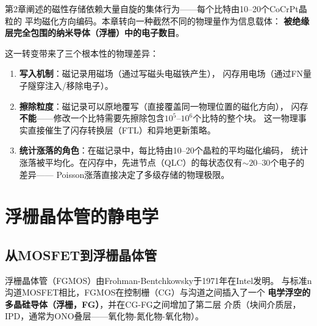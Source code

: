 \documentclass[11pt,a4paper,openany]{book}
\theoremstyle{definition}
\theoremstyle{plain}
\theoremstyle{remark}
\begin{document}
第2章阐述的磁性存储依赖大量自旋的集体行为——每个比特由10--20个CoCrPt晶粒的
平均磁化方向编码。本章转向一种截然不同的物理量作为信息载体：
\textbf{被绝缘层完全包围的纳米导体（浮栅）中的电子数目}。

这一转变带来了三个根本性的物理差异：
\begin{enumerate}
  \item \textbf{写入机制}：磁记录用磁场（通过写磁头电磁铁产生），
  闪存用电场（通过FN量子隧穿注入/移除电子）。
  \item \textbf{擦除粒度}：磁记录可以原地覆写（直接覆盖同一物理位置的磁化方向），
  闪存\textbf{不能}——修改一个比特需要先擦除包含$10^5$--$10^6$个比特的整个块。
  这一物理事实直接催生了闪存转换层（FTL）和异地更新策略。
  \item \textbf{统计涨落的角色}：在磁记录中，每比特由10--20个晶粒的平均磁化编码，
  统计涨落被平均化。在闪存中，先进节点（QLC）的每状态仅有$\sim 20$--$30$个电子的差异——
  Poisson涨落直接决定了多级存储的物理极限。
\end{enumerate}

\section{浮栅晶体管的静电学}

\subsection{从MOSFET到浮栅晶体管}

浮栅晶体管（FGMOS）由Frohman-Bentchkowsky于1971年在Intel发明。
与标准n沟道MOSFET相比，FGMOS在控制栅（CG）与沟道之间插入了一个
\textbf{电学浮空的多晶硅导体（浮栅，FG）}，并在CG-FG之间增加了第二层
介质（块间介质层，IPD，通常为ONO叠层——氧化物-氮化物-氧化物）。
\end{document}

